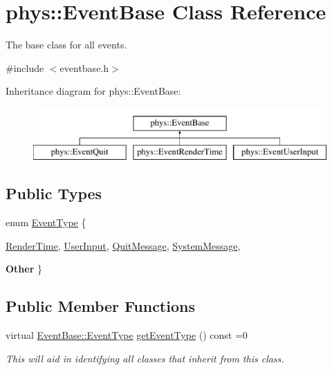 \hypertarget{classphys_1_1EventBase}{
\section{phys::EventBase Class Reference}
\label{dd/d80/classphys_1_1EventBase}
}


The base class for all events.  




{\ttfamily \#include $<$eventbase.h$>$}

Inheritance diagram for phys::EventBase:\begin{figure}[H]
\begin{center}
\leavevmode
\includegraphics[height=2cm]{dd/d80/classphys_1_1EventBase}
\end{center}
\end{figure}
\subsection*{Public Types}
\begin{DoxyCompactItemize}
\item 
enum \hyperlink{classphys_1_1EventBase_a5e6a8564e127f654123f0bf6a2751923}{EventType} \{ \par
\hyperlink{classphys_1_1EventBase_a5e6a8564e127f654123f0bf6a2751923acdfa47d279e8a1c460d557d14b85c7a5}{RenderTime}, 
\hyperlink{classphys_1_1EventBase_a5e6a8564e127f654123f0bf6a2751923a320cc0817dc2c2201501b12c50c89bef}{UserInput}, 
\hyperlink{classphys_1_1EventBase_a5e6a8564e127f654123f0bf6a2751923a84742ff55e9abdde8f5e0578d30f73a9}{QuitMessage}, 
\hyperlink{classphys_1_1EventBase_a5e6a8564e127f654123f0bf6a2751923a18594400c60af959158e9f5cc2cd5d08}{SystemMessage}, 
\par
{\bfseries Other}
 \}
\end{DoxyCompactItemize}
\subsection*{Public Member Functions}
\begin{DoxyCompactItemize}
\item 
virtual \hyperlink{classphys_1_1EventBase_a5e6a8564e127f654123f0bf6a2751923}{EventBase::EventType} \hyperlink{classphys_1_1EventBase_a0f39a25f4b64f7cf701e174454616366}{getEventType} () const =0
\begin{DoxyCompactList}\small\item\em This will aid in identifying all classes that inherit from this class. \item\end{DoxyCompactList}\end{DoxyCompactItemize}


